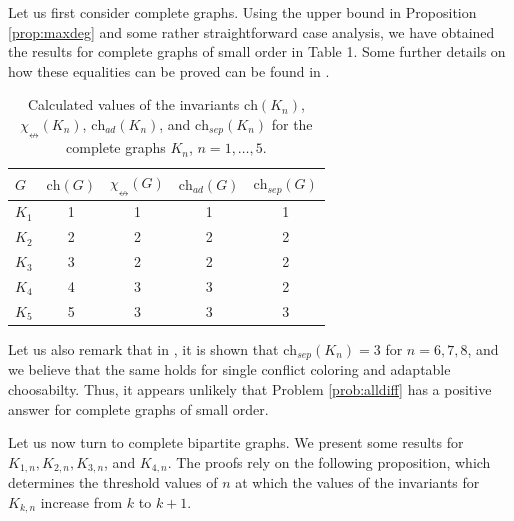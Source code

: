 \documentclass[12pt]{article}
\newcommand{\single}{\chi_{\nleftrightarrow}}
\newcommand{\ch}{\mathrm{ch}}
\begin{document}
Let us first consider complete graphs. Using the upper bound in
Proposition \ref{prop:maxdeg} and some rather straightforward
case analysis, we have obtained the results for 
complete graphs of small order in Table 1.
Some further details on how these equalities can be proved can be found in \cite{Eriksson}.
\begin{table}[H]
    \centering
        \begin{center}
        \begin{tabular}{|l|c|c|c|c|}
         \hline
         \rule{0pt}{2.5ex} $G$ & $\ch(G)$ & $\single(G)$ & $\ch_{ad}(G)$ & $\ch_{sep}(G)$ \\
         \hline
         \hline
         $K_1$& 1&1&1&1 \\ 
         $K_2$& 2&2&2&2\\
         $K_3$& 3&2&2&2\\
         $K_4$& 4&3&3&2\\
         $K_5$& 5&3&3&3\\
         \hline
        \end{tabular}
        \end{center}
    \caption{Calculated values of the invariants $\ch(K_n)$, $\single(K_n)$, $\ch_{ad}(K_n)$, and $\ch_{sep}(K_n)$ for the complete graphs $K_n$, $n=1,\dots, 5$.}
    \label{tab: Values of invariants for complete graphs}
\end{table}
	Let us also remark that in \cite{Eriksson}, it is shown that 
	$\ch_{sep}(K_n) =3$ for $n =6,7,8$, and we believe that
	the same holds for single conflict coloring and adaptable choosabilty. Thus, it appears unlikely that 
	Problem \ref{prob:alldiff} has a positive answer for complete graphs of small order.

	Let us now turn to complete bipartite graphs. We present 
	some results for $K_{1,n}, K_{2,n},K_{3,n}$, and $K_{4,n}$. 
	The proofs rely on the following proposition, which determines the threshold 
	values of $n$ at which the values of the invariants for $K_{k,n}$ increase from $k$ 
	to $k+1$.
\end{document}
